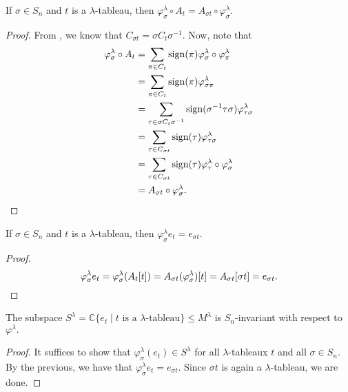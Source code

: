 \begin{lem}
	If $\sigma \in S_n$ and $t$ is a $\lambda$-tableau, then $\varphi^\lambda_\sigma \circ A_t = A_{\sigma t} \circ \varphi^\lambda_\sigma.$
\end{lem}
\begin{proof} 
	From , we know that $C_{\sigma t} = \sigma C_{t}\sigma^{-1}.$ Now, note that
	\begin{align*} 
		\varphi^\lambda_\sigma \circ A_t &= \sum_{\pi \in C_t} \operatorname{sign}(\pi)\varphi^\lambda_\sigma \circ \varphi^\lambda_\pi\\
		&= \sum_{\pi \in C_t} \operatorname{sign}(\pi)\varphi^\lambda_{\sigma\pi}\\
		&= \sum_{\tau \in \sigma C_t \sigma^{-1}} \operatorname{sign}(\sigma^{-1}\tau\sigma)\varphi^\lambda_{\tau\sigma}\\
		&= \sum_{\tau \in C_{\sigma t}} \operatorname{sign}(\tau)\varphi^\lambda_{\tau\sigma}\\
		&= \sum_{\tau \in C_{\sigma t}} \operatorname{sign}(\tau)\varphi^\lambda_{\tau}\circ\varphi^\lambda_{\sigma}\\
		&= A_{\sigma t} \circ \varphi^\lambda_\sigma. \qedhere
	\end{align*}
\end{proof}

\begin{cor}
	If $\sigma \in S_n$ and $t$ is a $\lambda$-tableau, then $\varphi^\lambda_\sigma e_t = e_{\sigma t}.$
\end{cor}
\begin{proof} 
	\begin{equation*} 
		\varphi^\lambda_\sigma e_t = \varphi^\lambda_\sigma(A_t[t]) = A_{\sigma t}(\varphi^\lambda_\sigma)[t] = A_{\sigma t}[\sigma t] = e_{\sigma t}. \qedhere
	\end{equation*}
\end{proof}

\begin{cor}
	The subspace $S^\lambda = \mathbb{C}\{e_t \mid t \text{ is a } \lambda\text{-tableau}\} \le M^\lambda$ is $S_n$-invariant with respect to $\varphi^\lambda.$
\end{cor}
\begin{proof} 
	It suffices to show that $\varphi^\lambda_\sigma(e_t) \in S^\lambda$ for all $\lambda$-tableaux $t$ and all $\sigma \in S_n.$ By the previous, we have that $\varphi^\lambda_\sigma e_t = e_{\sigma t}.$ Since $\sigma t$ is again a $\lambda$-tableau, we are done.
\end{proof}

